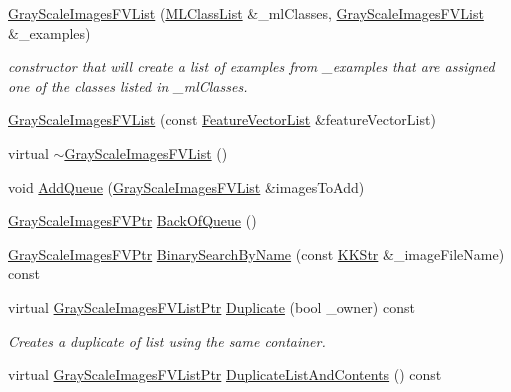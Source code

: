\begin{DoxyCompactItemize}
\hyperlink{class_k_k_m_l_l_1_1_gray_scale_images_f_v_list_a4586ec9e554203d0e16166a3e84066c8}{Gray\+Scale\+Images\+F\+V\+List} (\hyperlink{class_k_k_m_l_l_1_1_m_l_class_list}{M\+L\+Class\+List} \&\+\_\+ml\+Classes, \hyperlink{class_k_k_m_l_l_1_1_gray_scale_images_f_v_list}{Gray\+Scale\+Images\+F\+V\+List} \&\+\_\+examples)
\begin{DoxyCompactList}\small\item\em constructor that will create a list of examples from \+\_\+examples that are assigned one of the classes listed in \+\_\+ml\+Classes. \end{DoxyCompactList}\item 
\hyperlink{class_k_k_m_l_l_1_1_gray_scale_images_f_v_list_aa00f8dc79c567a2e4f8161bf966e8b7d}{Gray\+Scale\+Images\+F\+V\+List} (const \hyperlink{class_k_k_m_l_l_1_1_feature_vector_list}{Feature\+Vector\+List} \&feature\+Vector\+List)
\item 
virtual \hyperlink{class_k_k_m_l_l_1_1_gray_scale_images_f_v_list_a0f89575b104dfad177a0e5d2f1953624}{$\sim$\+Gray\+Scale\+Images\+F\+V\+List} ()
\item 
void \hyperlink{class_k_k_m_l_l_1_1_gray_scale_images_f_v_list_aba7237106973d57077b83efe3606f079}{Add\+Queue} (\hyperlink{class_k_k_m_l_l_1_1_gray_scale_images_f_v_list}{Gray\+Scale\+Images\+F\+V\+List} \&images\+To\+Add)
\item 
\hyperlink{namespace_k_k_m_l_l_ac3f21d259a7b1893920f27296d70bc6e}{Gray\+Scale\+Images\+F\+V\+Ptr} \hyperlink{class_k_k_m_l_l_1_1_gray_scale_images_f_v_list_ac9c12a344b952f9141fe643c9890d649}{Back\+Of\+Queue} ()
\item 
\hyperlink{namespace_k_k_m_l_l_ac3f21d259a7b1893920f27296d70bc6e}{Gray\+Scale\+Images\+F\+V\+Ptr} \hyperlink{class_k_k_m_l_l_1_1_gray_scale_images_f_v_list_a28209170c7a8919bdb9b984dc5e85d98}{Binary\+Search\+By\+Name} (const \hyperlink{class_k_k_b_1_1_k_k_str}{K\+K\+Str} \&\+\_\+image\+File\+Name) const 
\item 
virtual \hyperlink{class_k_k_m_l_l_1_1_gray_scale_images_f_v_list_adf1c0ec2049ac8cb8689dc30f8f78ac3}{Gray\+Scale\+Images\+F\+V\+List\+Ptr} \hyperlink{class_k_k_m_l_l_1_1_gray_scale_images_f_v_list_af8de31a61f325589d76c2247803176a6}{Duplicate} (bool \+\_\+owner) const 
\begin{DoxyCompactList}\small\item\em Creates a duplicate of list using the same container. \end{DoxyCompactList}\item 
virtual \hyperlink{class_k_k_m_l_l_1_1_gray_scale_images_f_v_list_adf1c0ec2049ac8cb8689dc30f8f78ac3}{Gray\+Scale\+Images\+F\+V\+List\+Ptr} \hyperlink{class_k_k_m_l_l_1_1_gray_scale_images_f_v_list_a994cfae350ad453a6feef076a9664827}{Duplicate\+List\+And\+Contents} () const 

\end{DoxyCompactItemize}
